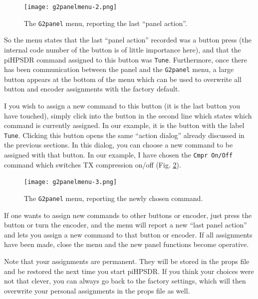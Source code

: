 \documentclass[12pt]{book}
\def\bltt#1{\texttt{\color{blue}#1}}
\def\pH{pi\-HPSDR\xspace}
\begin{document}
\begin{figure}[ht]
\center
\texttt{[image: g2panelmenu-2.png]}
\caption{The \bltt{G2panel} menu, reporting the last ``panel action''.}
\label{fig:g2panelmenu-recorded}
\end{figure}

So the menu states that the last ``panel action'' recorded was a button press (the internal code number
of the button is of little importance here), and that the \pH command assigned to this button was
\bltt{Tune}. Furthermore, once there has been communication between the panel and the \bltt{G2panel}
menu, a large button appears at the bottom of the menu which can be used to overwrite all button and
encoder assignments with the factory default.

I you wish to assign a new command to this button (it is the last button you have touched), simply
click into the button in the second line which states which command is currently assigned. In our
example, it is the button with the label \bltt{Tune}. Clicking this button opens the same
``action dialog'' already discussed in the previous sections. In this dialog, you can choose a
new command to be assigned with that button. In our example, I have chosen the \bltt{Cmpr On/Off}
command which switches TX compression on/off (Fig. \ref{fig:g2panelmenu-chosen}).

\begin{figure}[ht]
\center
\texttt{[image: g2panelmenu-3.png]}
\caption{The \bltt{G2panel} menu, reporting the newly chosen command.}
\label{fig:g2panelmenu-chosen}
\end{figure}

If one wants to assign new commands to other buttons or encoder, just press the button or turn the
encoder, and the menu will report a new ``last panel action'' and lets you assign a new command
to that button or encoder. If all assignments have been made, close the menu and the new panel
functions become operative.

Note that your assignments are permanent. They will be stored in the props file and be restored
the next time you start \pH. If you think your choices were not that clever, you can always go back
to the factory settings, which will then overwrite your personal assignments in the props file as well.

\end{document}
